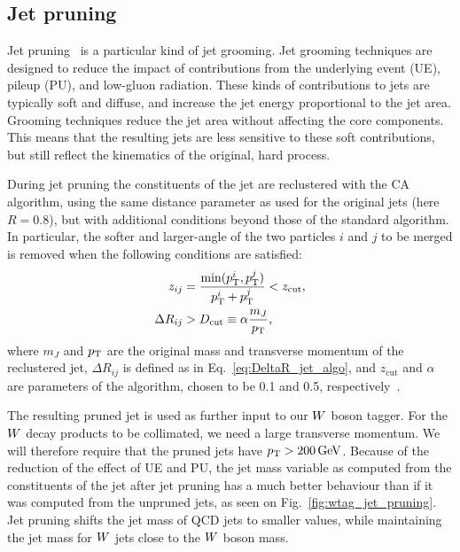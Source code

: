 
\subsection{Jet pruning}

Jet pruning~\cite{Ellis:2009su,Ellis:2009me} is a particular kind of jet grooming. Jet grooming
techniques are designed to reduce the impact of contributions from the underlying event (UE), pileup
(PU), and low-\pt gluon radiation. These kinds of contributions to jets are typically soft and
diffuse, and increase the jet energy proportional to the jet area. Grooming techniques reduce the
jet area without affecting the core components. This means that the resulting jets are less
sensitive to these soft contributions, but still reflect the kinematics of the original, hard
process.


During jet pruning the constituents of the jet are reclustered with the CA algorithm, using the
same distance parameter as used for the original jets (here $R=0.8$), but with additional conditions
beyond those of the standard algorithm.
In particular, the softer and larger-angle of the two particles $i$ and $j$ to be merged is removed
when the following conditions are satisfied:
\begin{align}
  z_{ij} &= \frac{\min( p_{\mathrm{T}}^i , p_{\mathrm{T}}^j )}{p_{\mathrm{T}}^i + p_{\mathrm{T}}^j} < z_{\textrm{cut}}, \\
  \Delta R_{ij} &> D_{\textrm{cut}} \equiv \alpha \frac{m_J}{p_{\mathrm{T}}} ,
\end{align}
where $m_J$ and $p_{\mathrm{T}}$ are the original mass and transverse momentum of the reclustered jet,
$\Delta R_{ij}$ is defined as in Eq.~\ref{eq:DeltaR_jet_algo}, and
$z_\textrm{cut}$ and $\alpha$ are parameters of the algorithm, chosen to be 0.1 and 0.5,
respectively~\cite{Chatrchyan:2013vbb}. 

The resulting pruned jet is used as further input to our $W$ boson tagger. For the $W$ decay
products to be collimated, we need a large transverse momentum. We will therefore require that the
pruned jets have $p_{\mathrm{T}} > 200\,\text{Ge\hspace{-.08em}V}$. 
Because of the reduction of the effect of UE and PU, the jet mass variable as computed from the
constituents of the jet after jet pruning has a much better behaviour than if it was computed from
the unpruned jets, as seen on Fig.~\ref{fig:wtag_jet_pruning}. Jet pruning shifts the jet mass of
QCD jets
to smaller values, while maintaining the jet mass for $W$ jets close to the $W$ boson mass.

